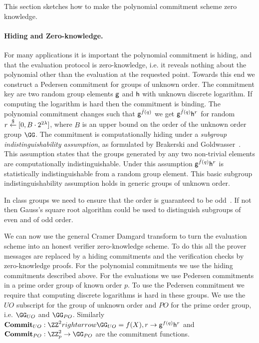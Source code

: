 This section sketches how to make the polynomial commitment scheme zero knowledge. 

\paragraph{Hiding and Zero-knowledge.} For many applications it is important the polynomial commitment is hiding, and that the evaluation protocol is zero-knowledge, i.e. it reveals nothing about the polynomial other than the evaluation at the requested point.
Towards this end we construct a Pedersen commitment for groups of unknown order.
The commitment key are two random group elements $\mathsf{g}$ and $\mathsf{h}$ with unknown discrete logarithm. If computing the logarithm is hard then the commitment is binding.
 The polynomial commitment changes such that $\mathsf{g}^{\bar{f}(q)}$ we get $\mathsf{g}^{\bar{f}(q)}\mathsf{h}^{r}$ for random $r \overset{\$}{\gets} [0, B\cdot 2^{2\lambda}]$, where $B$ is an upper bound on the order of the unknown order group $\GG$.  
The commitment is computationally hiding under a \emph{subgroup indistinguishability assumption}, as formulated by Brakerski and Goldwasser~\cite{C:BraGol10}. This assumption states that the groups generated by any two non-trivial elements are computationally indistinguishable. Under this assumption $\mathsf{g}^{\bar{f}(q)}\mathsf{h}^r$ is statistically indistinguishable from a random group element.
This basic subgroup indistinguishability assumption holds in generic groups of unknown order. 

In class groups we need to ensure that the order is guaranteed to be odd~\cite{PKC/BucHam01}. If not then Gauss's square root algorithm could be used to distinguish subgroups of even and of odd order.

We can now use the general Cramer Damgard\cite{C:CraDam98} transform to turn the evaluation scheme into an honest verifier zero-knowledge scheme.  
To do this all the prover messages are replaced by a hiding commitments and the verification checks by zero-knowledge proofs. For the polynomial commitments we use the hiding commitments described above. For the evaluations we use Pedersen commitments\cite{C:Pedersen91} in a prime order group of known order $p$. To use the Pedersen commitment we require that computing discrete logarithms is hard in these groups. 
We use the ${UO}$ subscript for the group of unknown order and $PO$ for the prime order group, i.e. $\GG_{UO}$ and $\GG_{PO}$.
Similarly $\commit_{UO}:\ZZ^2 rightarrow\GG_{UO}=f(X),r \rightarrow \gr{g}^{f(q)}\gr{h}^{r}$ and $\commit_{PO}:\ZZ_p^2\rightarrow \GG_{PO}$ are the commitment functions.

